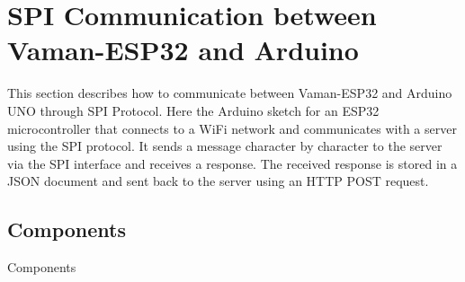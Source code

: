 \section{SPI Communication between Vaman-ESP32 and Arduino}
This section describes how to communicate between Vaman-ESP32 and Arduino UNO
through SPI Protocol. Here the Arduino sketch for an ESP32 microcontroller that 
connects to a WiFi network and communicates with a server using the SPI 
protocol. It sends a message character by character to the server via the SPI 
interface and receives a response. The received response is stored in a JSON 
document and sent back to the server using an HTTP POST request.
\subsection{Components}

\begin{table}[!ht]
\centering

\caption{Components}
\label{table:spi-components}
\end{table}

